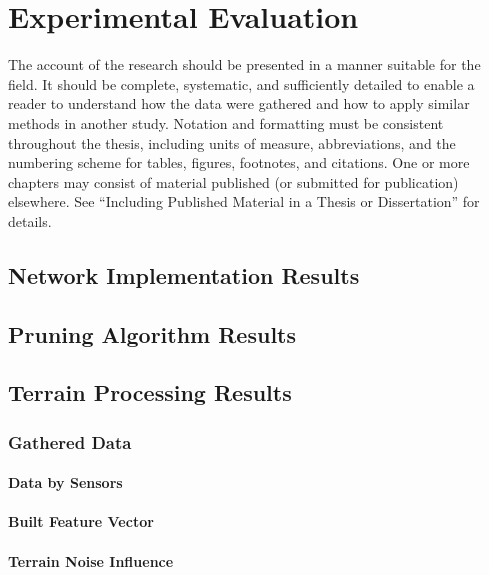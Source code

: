 \chapter{Experimental Evaluation}
\label{chap:results}

The account of the research should be presented in a manner suitable for the field. It should be complete, systematic, and sufficiently detailed to enable a reader to understand how the data were gathered and how to apply similar methods in another study. Notation and formatting must be consistent throughout the thesis, including units of measure, abbreviations, and the numbering scheme for tables, figures, footnotes, and citations. One or more chapters may consist of material published (or submitted for publication) elsewhere. See “Including Published Material in a Thesis or Dissertation” for details.

\section{Network Implementation Results}

\section{Pruning Algorithm Results}

\section{Terrain Processing Results}

\subsection{Gathered Data} \label{ssec:gathered_data}

\subsubsection*{Data by Sensors} \label{sssec:data_by_sensors}

\subsubsection*{Built Feature Vector} \label{sssec:data_by_sensors}

\subsubsection*{Terrain Noise Influence} \label{sssec:terrain_noise_influence}


